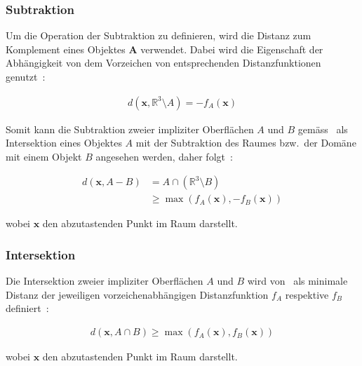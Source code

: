 \subsubsection{Subtraktion}
\label{ssubsec:implicit_surfaces_ops_subtraction}

Um die Operation der Subtraktion zu definieren, wird die Distanz zum
Komplement eines Objektes $\bm{A}$ verwendet. Dabei wird die Eigenschaft
der Abhängigkeit von dem Vorzeichen von entsprechenden Distanzfunktionen
genutzt~\parencite[S. 532]{hart_sphere_1994}:

\begin{gather}
    d(\bm{x}, \mathbb{R}^{3} \setminus A) = -f_{A}(\bm{x})
\end{gather}

Somit kann die Subtraktion zweier impliziter Oberflächen $A$ und $B$
gemäss~\citeauthor{hart_sphere_1994} als Intersektion eines Objektes $A$ mit der
Subtraktion des Raumes bzw.\ der Domäne mit einem Objekt $B$ angesehen werden,
daher folgt~\parencite[S. 532]{hart_sphere_1994}:

\begin{align}
    d(\bm{x}, A - B) &= A \cap (\mathbb{R}^{3} \setminus B) \\
                     &\geq \max(f_{A}(\bm{x}), -f_{B}(\bm{x}))
\end{align}

wobei $\bm{x}$ den abzutastenden Punkt im Raum darstellt.

\subsubsection{Intersektion}
\label{ssubsec:implicit_surfaces_ops_intersection}

Die Intersektion zweier impliziter Oberflächen $A$ und $B$ wird
von~\cite{hart_sphere_1994} als minimale Distanz der jeweiligen
vorzeichenabhängigen  Distanzfunktion $f_{A}$ respektive $f_{B}$
definiert~\parencite[S. 532]{hart_sphere_1994}:

\begin{gather}
    d(\bm{x}, A \cap B) \geq \max(f_{A}(\bm{x}), f_{B}(\bm{x}))
\end{gather}

wobei $\bm{x}$ den abzutastenden Punkt im Raum darstellt.
